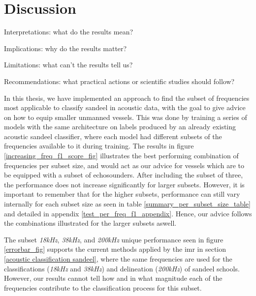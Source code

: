 \chapter{Discussion}
    
    Interpretations: what do the results mean?
    
    Implications: why do the results matter?
    
    Limitations: what can’t the results tell us?
    
    Recommendations: what practical actions or scientific studies should follow?
    
    In this thesis, we have implemented an approach to find the subset of frequencies most applicable to classify sandeel in acoustic data, with the goal to give advice on how to equip smaller unmanned vessels. This was done by training a series of models with the same architecture on labels produced by an already existing acoustic sandeel classifier, where each model had different subsets of the frequencies available to it during training. The results in figure  \ref{increasing_freq_f1_score_fig} illustrates the best performing combination of frequencies per subset size, and would act as our advice for vessels which are to be equipped with a subset of echosounders. After including the subset of three, the performance does not increase significantly for larger subsets. However, it is important to remember that for the higher subsets, performance can still vary internally for each subset size as seen in table \ref{summary_per_subset_size_table} and detailed in appendix \ref{test_per_freq_f1_appendix}. Hence, our advice follows the combinations illustrated for the larger subsets aswell. 
    

    
    The subset \textit{18kHz}, \textit{38kHz}, and \textit{200kHz} unique performance seen in figure \ref{errorbar_fig} supports the current methods applied by the \gls{imr} in section \ref{acoustic classification sandeel}, where the same frequencies are used for the classifications (\textit{18kHz} and \textit{38kHz}) and delineation (\textit{200kHz}) of sandeel schools. However, our results cannot tell how and in what magnitude each of the frequencies contribute to the classification process for this subset.
    

